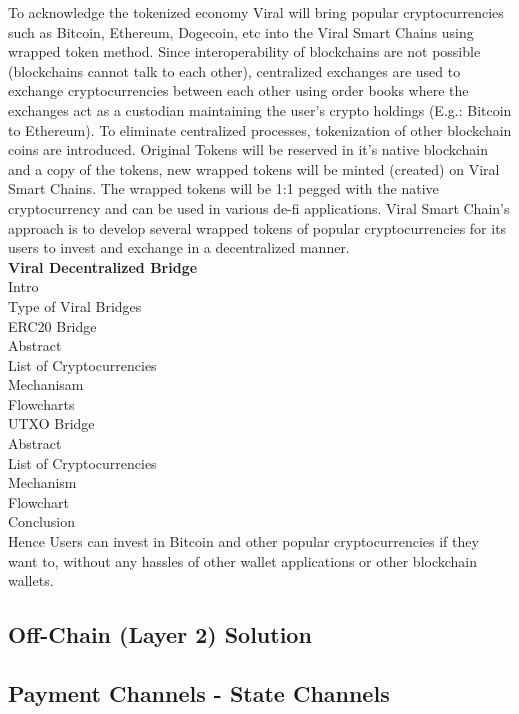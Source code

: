 \documentclass[10pt]{article}
\begin{document}
To acknowledge the tokenized economy Viral will bring popular cryptocurrencies such as Bitcoin, Ethereum, Dogecoin, etc into the Viral Smart Chains using wrapped token method. Since interoperability of blockchains are not possible (blockchains cannot talk to each other), centralized exchanges are used to exchange cryptocurrencies between each other using order books where the exchanges act as a custodian maintaining the user’s crypto holdings (E.g.: Bitcoin to Ethereum). To eliminate centralized processes, tokenization of other blockchain coins are introduced. Original Tokens will be reserved in it's native blockchain and a copy of the tokens, new wrapped tokens will be minted (created) on Viral Smart Chains. The wrapped tokens will be 1:1 pegged with the native cryptocurrency and can be used in various de-fi applications. Viral Smart Chain's approach is to develop several wrapped tokens of popular cryptocurrencies for its users to invest and exchange in a decentralized manner.\\

\textbf{Viral Decentralized Bridge}\\

Intro\\
Type of Viral Bridges\\
ERC20 Bridge\\
Abstract\\
List of Cryptocurrencies\\
Mechanisam\\
Flowcharts\\
UTXO Bridge\\
Abstract\\
List of Cryptocurrencies\\
Mechanism\\
Flowchart\\
Conclusion\\
Hence Users can invest in Bitcoin and other popular cryptocurrencies if they want to, without any hassles of other wallet applications or other blockchain wallets.

\subsection{Off-Chain (Layer 2) Solution}

\subsection{Payment Channels - State Channels}
\end{document}
